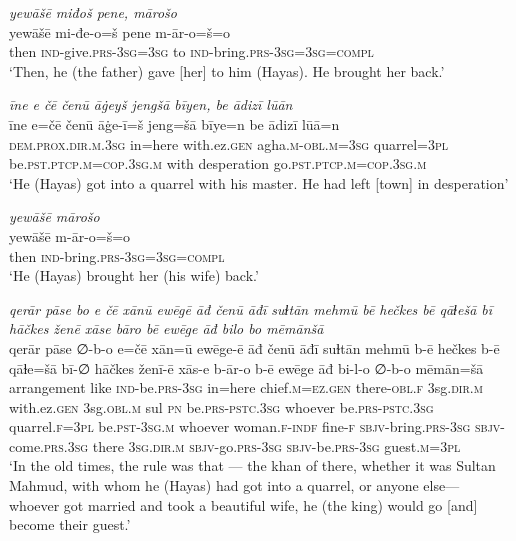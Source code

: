 \ea \label{ŽH.61}
\textit{yewāšē miđoš pene, mārošo} \\ 
\gll yewāšē mi-đe-o=š pene m-ār-o=š=o \\ 
 then \textsc{ind-}give\textsc{.prs}\textsc{-3sg}\textsc{=3sg} to \textsc{ind-}bring\textsc{.prs}\textsc{-3sg}\textsc{=3sg}\textsc{=compl} \\ 
\glt `Then, he (the father) gave [her] to him (Hayas). He brought her back.'
\z 
 
\ea \label{ŽH.62}
\textit{īne e čē čenū āġeyš jengšā bīyen, be ādizī lūān} \\ 
\gll īne e=čē čenū āġe-ī=š jeng=šā bīye=n be ādizī lūā=n \\ 
 \textsc{dem.prox}\textsc{.dir}\textsc{.m}\textsc{.3sg} in=here with.ez\textsc{.gen} agha\textsc{.m}\textsc{-obl}\textsc{.m}\textsc{=3sg} quarrel\textsc{=3pl} be\textsc{.pst}\textsc{.ptcp}\textsc{.m}\textsc{=cop}\textsc{.3sg}\textsc{.m} with desperation go\textsc{.pst}\textsc{.ptcp}\textsc{.m}\textsc{=cop}\textsc{.3sg}\textsc{.m} \\ 
\glt `He (Hayas) got into a quarrel with his master. He had left [town] in desperation'
\z 
 
\ea \label{ŽH.63}
\textit{yewāšē mārošo} \\ 
\gll yewāšē m-ār-o=š=o \\ 
 then \textsc{ind-}bring\textsc{.prs}\textsc{-3sg}\textsc{=3sg}\textsc{=compl} \\ 
\glt `He (Hayas) brought her (his wife) back.'
\z 
 
\ea \label{ŽH.64}
\textit{qerār pāse bo e čē xānū ewēgē āđ čenū āđī suɫtān mehmū bē hečkes bē qāɫešā bī hāčkes ženē xāse bāro bē ewēge āđ bilo bo mēmānšā} \\ 
\gll qerār pāse ∅-b-o e=čē xān=ū ewēge-ē āđ čenū āđī suɫtān mehmū b-ē hečkes b-ē qāɫe=šā bī-∅ hāčkes ženī-ē xās-e b-ār-o b-ē ewēge āđ bi-l-o ∅-b-o mēmān=šā \\ 
 arrangement like \textsc{ind-}be\textsc{.prs}\textsc{-3sg} in=here chief\textsc{.m}\textsc{=ez}\textsc{.gen} there\textsc{-obl}\textsc{\textsc{.f}} 3sg\textsc{.dir}\textsc{.m} with.ez\textsc{.gen} 3sg\textsc{.obl}\textsc{.m} sul \textsc{pn} be\textsc{.prs}\textsc{-pstc}\textsc{.3sg} whoever be\textsc{.prs}\textsc{-pstc}\textsc{.3sg} quarrel\textsc{\textsc{.f}}\textsc{=3pl} be\textsc{.pst}\textsc{-3sg}\textsc{.m} whoever woman\textsc{\textsc{.f}}\textsc{-indf} fine\textsc{-f} \textsc{sbjv-}bring\textsc{.prs}\textsc{-3sg} \textsc{sbjv-}come\textsc{.prs}\textsc{.3sg} there \textsc{3sg}\textsc{.dir}\textsc{.m} \textsc{sbjv-}go\textsc{.prs}\textsc{-3sg} \textsc{sbjv-}be\textsc{.prs}\textsc{-3sg} guest\textsc{.m}\textsc{=3pl} \\ 
\glt `In the old times, the rule was that — the khan of there, whether it was Sultan Mahmud, with whom he (Hayas) had got into a quarrel, or anyone else— whoever got married and took a beautiful wife, he (the king) would go [and] become their guest.'
\z 
 
